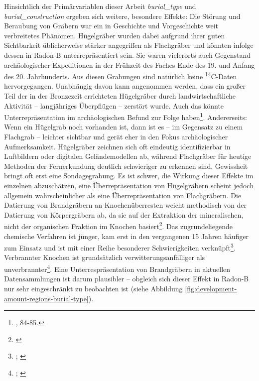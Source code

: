 \documentclass[openany,twoside,twocolumn]{book}
\let\rmarkdownfootnote\footnote%
\def\footnote{\protect\rmarkdownfootnote}
\begin{document}
Hinsichtlich der Primärvariablen dieser Arbeit \emph{burial\_type} und
\emph{burial\_construction} ergeben sich weitere, besondere Effekte: Die
Störung und Beraubung von Gräbern war ein in Geschichte und
Vorgeschichte weit verbreitetes Phänomen. Hügelgräber wurden dabei
aufgrund ihrer guten Sichtbarkeit üblicherweise stärker angegriffen als
Flachgräber und könnten infolge dessen in Radon-B unterrepräsentiert
sein. Sie waren vielerorts auch Gegenstand archäologischer Expeditionen
in der Frühzeit des Faches Ende des 19. und Anfang des 20. Jahrhunderts.
Aus diesen Grabungen sind natürlich keine \textsuperscript{14}C-Daten
hervorgegangen. Unabhängig davon kann angenommen werden, dass ein großer
Teil der in der Bronzezeit errichteten Hügelgräber durch
landwirtschaftliche Aktivität -- langjähriges Überpflügen -- zerstört
wurde. Auch das könnte Unterrepräsentation im archäologischen Befund zur
Folge haben\footnote{\textcite{harding_european_2000}, 84-85.}.
Andererseits: Wenn ein Hügelgrab noch vorhanden ist, dann ist es -- im
Gegensatz zu einem Flachgrab -- leichter sichtbar und gerät eher in den
Fokus archäologischer Aufmerksamkeit. Hügelgräber zeichnen sich oft
eindeutig identifizierbar in Luftbildern oder digitalen Geländemodellen
ab, während Flachgräber für heutige Methoden der Fernerkundung deutlich
schwieriger zu erkennen sind. Gewissheit bringt oft erst eine
Sondagegrabung. Es ist schwer, die Wirkung dieser Effekte im einzelnen
abzuschätzen, eine Überrepräsentation von Hügelgräbern scheint jedoch
allgemein wahrscheinlicher als eine Überrepräsentation von Flachgräbern.
Die Datierung von Brandgräbern an Knochenüberresten weicht methodisch
von der Datierung von Körpergräbern ab, da sie auf der Extraktion der
mineralischen, nicht der organischen Fraktion im Knochen
basiert\footnote{\textcite{lanting_dating_2001}}. Das zugrundeliegende
chemische Verfahren ist jünger, kam erst in den vergangenen 15 Jahren
häufiger zum Einsatz und ist mit einer Reihe besonderer Schwierigkeiten
verknüpft\footnote{\textcite{olsen_characterisation_2008};
  \textcite{strydonck_14c_2009}}. Verbrannter Knochen ist grundsätzlich
verwitterungsanfälliger als unverbrannter\footnote{\textcite{kalsbeek_preservation_2006};
  \textcite{stiner_differential_1995}}. Eine Unterrespräsentation von
Brandgräbern in aktuellen Datensammlungen ist darum plausibler --
obgleich sich dieser Effekt in Radon-B nur sehr eingeschränkt zu
beobachten ist (siehe Abbildung
\ref{fig:development-amount-regions-burial-type}).
\end{document}
